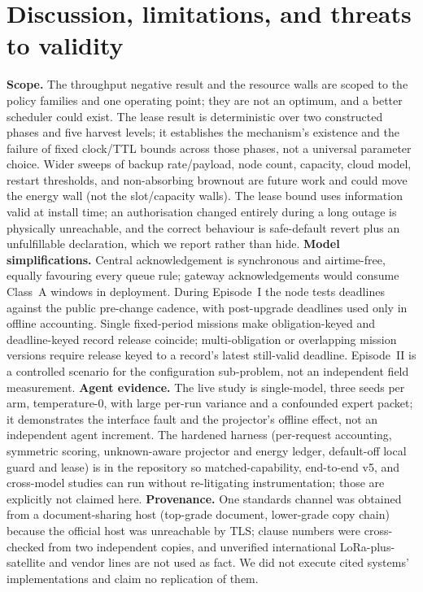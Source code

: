 \documentclass[11pt]{article}
\begin{document}
\section{Discussion, limitations, and threats to validity}
\label{sec:disc}
\textbf{Scope.} The throughput negative result and the resource walls are scoped to the policy
families and one operating point; they are not an optimum, and a better scheduler could exist. The
lease result is deterministic over two constructed phases and five harvest levels; it establishes
the mechanism's existence and the failure of fixed clock/TTL bounds across those phases, not a
universal parameter choice. Wider sweeps of backup rate/payload, node count, capacity, cloud
model, restart thresholds, and non-absorbing brownout are future work and could move the energy
wall (not the slot/capacity walls). The lease bound uses information valid at install time; an
authorisation changed entirely during a long outage is physically unreachable, and the correct
behaviour is safe-default revert plus an unfulfillable declaration, which we report rather than
hide.
\textbf{Model simplifications.} Central acknowledgement is synchronous and airtime-free, equally
favouring every queue rule; gateway acknowledgements would consume Class~A windows in deployment.
During Episode~I the node tests deadlines against the public pre-change cadence, with post-upgrade
deadlines used only in offline accounting. Single fixed-period missions make obligation-keyed and
deadline-keyed record release coincide; multi-obligation or overlapping mission versions require
release keyed to a record's latest still-valid deadline. Episode~II is a controlled scenario for
the configuration sub-problem, not an independent field measurement.
\textbf{Agent evidence.} The live study is single-model, three seeds per arm, temperature-0, with
large per-run variance and a confounded expert packet; it demonstrates the interface fault and the
projector's offline effect, not an independent agent increment. The hardened harness (per-request
accounting, symmetric scoring, unknown-aware projector and energy ledger, default-off local guard
and lease) is in the repository so matched-capability, end-to-end v5, and cross-model studies can
run without re-litigating instrumentation; those are explicitly not claimed here.
\textbf{Provenance.} One standards channel was obtained from a document-sharing host (top-grade
document, lower-grade copy chain) because the official host was unreachable by TLS; clause numbers
were cross-checked from two independent copies, and unverified international LoRa-plus-satellite
and vendor lines are not used as fact. We did not execute cited systems' implementations and claim
no replication of them.
\end{document}
